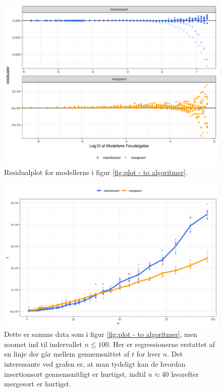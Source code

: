 \begin{figure}
	\begin{center}
		\includegraphics[scale=0.7]{../img/toAlgoritmerResidual.png}
	\end{center}
	\caption{Residualplot for modellerne i figur \ref{fig:plot - to algoritmer}.}
	\label{fig:toAlgoritmerResidual}
\end{figure}



\begin{figure}
	\begin{center}
		\includegraphics[scale=0.6]{../img/toAlgoritmerZoomedGns.png}
	\end{center}
	\caption{Dette er samme data som i figur \ref{fig:plot - to algoritmer}, men zoomet ind til indervallet $n \leq 100$. Her er regressionerne erstattet af en linje der går mellem gennemsnittet af $t$ for hver $n$. Det interessante ved grafen er, at man tydeligt kan de hvordan insertionsort gennemsnitligt er hurtigst, indtil $n \approx 40$ hvorefter mergesort er hurtigst.}
	\label{fig:toAlgoritmerZoomedGns}
\end{figure}

